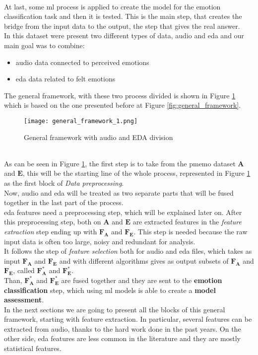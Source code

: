 \\
At last, some \gls{ml} process is applied to create the model for the emotion classification task and then it is tested. This is the main step, that creates the bridge from the input data to the output, the step that gives the real answer.
\\
In this dataset were present two different types of data, audio and \gls{eda} and our main goal was to combine:
\begin{itemize}
	\item audio data connected to perceived emotions
	\item \gls{eda} data related to felt emotions
\end{itemize}
The general framework, with these two process divided is shown in Figure \ref{fig:general_framework_1} which is based on the one presented before at Figure  \ref{fig:general_framework}.
\begin{figure}[h]
    \centering
    \texttt{[image: general\_framework\_1.png]} 
	\caption{General framework with audio and EDA division}
    \label{fig:general_framework_1}
\end{figure}
\\
As can be seen in Figure \ref{fig:general_framework_1}, the first step is to take from the \gls{pmemo} dataset $\textbf{A}$ and $\textbf{E}$, this will be the starting line of the whole process, represented in Figure \ref{fig:general_framework_1} as the first block of \textit{Data preprocessing}.
\\
Now, audio and \gls{eda} will be treated as two separate parts that will be fused together in the last part of the process.
\\
\gls{eda} features need a preprocessing step, which will be explained later on. After this preprocessing step, both on $\textbf{A}$ and $\textbf{E}$ are extracted features in the \textit{feature extraction} step ending up with $\textbf{F}_\textbf{A}$ and $\textbf{F}_\textbf{E}$. This step is needed because the raw input data is often too large, noisy and redundant for analysis.
\\
It follows the step of \textit{feature selection} both for audio and \gls{eda} files, which takes as input $\textbf{F}_\textbf{A}$ and $\textbf{F}_\textbf{E}$ and with different algorithms gives as output subsets of $\textbf{F}_\textbf{A}$ and $\textbf{F}_\textbf{E}$, called $\textbf{F}_\textbf{A}^*$ and $\textbf{F}_\textbf{E}^*$.
\\
Than, $\textbf{F}_\textbf{A}^*$ and $\textbf{F}_\textbf{E}^*$ are fused together and they are sent to the \textbf{emotion classification} step, which using \gls{ml} models is able to create a \textbf{model assessment}.
\\ \indent
In the next sections we are going to present all the blocks of this general framework, starting with feature extraction. In particular, several features can be extracted from audio, thanks to the hard work done in the past years. On the other side, \gls{eda} features are less common in the literature and they are mostly statistical features.

